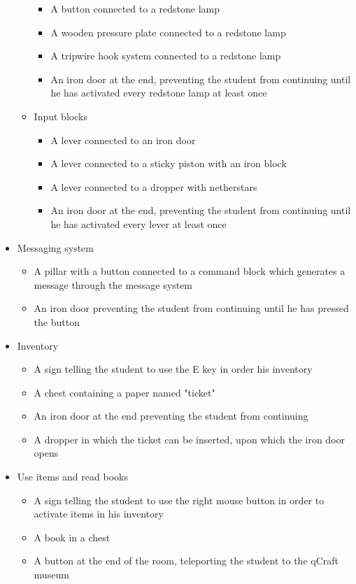 \documentclass[11pt,twoside]{report} %
\begin{document}
\begin{itemize}
\begin{itemize}
\begin{itemize}
			\item A button connected to a redstone lamp
			\item A wooden pressure plate connected to a redstone lamp
			\item A tripwire hook system connected to a redstone lamp
			\item An iron door at the end, preventing the student from continuing until he has activated every redstone lamp at least once
		\end{itemize}
		\item Input blocks
		\begin{itemize}
			\item A lever connected to an iron door
			\item A lever connected to a sticky piston with an iron block
			\item A lever connected to a dropper with netherstars
			\item An iron door at the end, preventing the student from continuing until he has activated every lever at least once
		\end{itemize}
	\end{itemize}
	\item Messaging system
	\begin{itemize}
		\item A pillar with a button connected to a command block which generates a message through the message system
		\item An iron door preventing the student from continuing until he has pressed the button
	\end{itemize}
	\item Inventory
	\begin{itemize}
		\item A sign telling the student to use the E key in order his inventory
		\item A chest containing a paper named "ticket"
		\item An iron door at the end preventing the student from continuing
		\item A dropper in which the ticket can be inserted, upon which the iron door opens
	\end{itemize}
	\item Use items and read books
	\begin{itemize}
		\item A sign telling the student to use the right mouse button in order to activate items in his inventory
		\item A book in a chest
		\item A button at the end of the room, teleporting the student to the qCraft museum
	\end{itemize}
\end{itemize}
\end{document}
